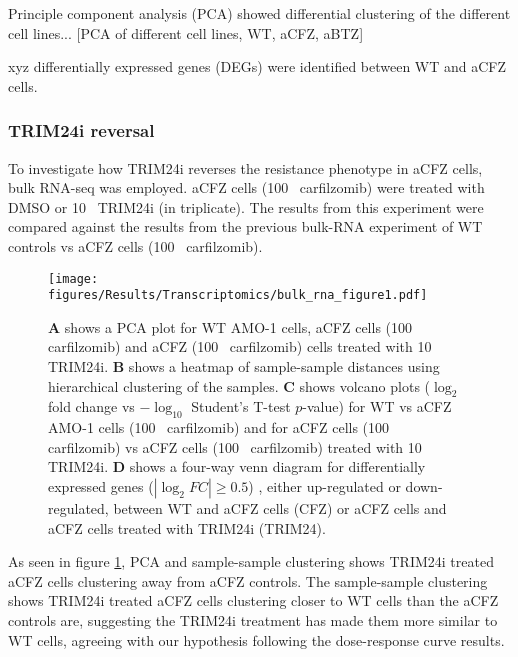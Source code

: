 Principle component analysis (PCA) showed differential clustering of the different cell lines...
[PCA of different cell lines, WT, aCFZ, aBTZ]


xyz differentially expressed genes (DEGs) were identified between WT and aCFZ cells.

\subsubsection{TRIM24i reversal}
To investigate how TRIM24i reverses the resistance phenotype in aCFZ cells, bulk RNA-seq was employed.
aCFZ cells (100\si{\nano\Molar} carfilzomib) were treated with DMSO or 10\si{\mu\Molar} TRIM24i (in triplicate).
The results from this experiment were compared against the results from the previous bulk-RNA experiment of WT controls vs aCFZ cells (100\si{\nano\Molar} carfilzomib).

\begin{figure}[htb]
\centering
\texttt{[image: figures/Results/Transcriptomics/bulk\_rna\_figure1.pdf]}
\caption[WT, aCFZ and TRIM24i reversal, transcriptomics differential expression and clustering]{\textbf{A} shows a PCA plot for WT AMO-1 cells, aCFZ cells (100\si{\nano\Molar} carfilzomib) and aCFZ (100\si{\nano\Molar} carfilzomib) cells treated with 10\si{\mu\Molar} TRIM24i.
\textbf{B} shows a heatmap of sample-sample distances using hierarchical clustering of the samples.
\textbf{C} shows volcano plots ($\log_{2}$ fold change vs $-\log_{10}$ Student's T-test $p$-value) for WT vs aCFZ AMO-1 cells (100\si{\nano\Molar} carfilzomib) and for aCFZ cells (100\si{\nano\Molar} carfilzomib) vs aCFZ cells (100\si{\nano\Molar} carfilzomib) treated with 10\si{\mu\Molar} TRIM24i.
\textbf{D} shows a four-way venn diagram for differentially expressed genes ($|\log_{2}FC| \geq 0.5$) , either up-regulated or down-regulated, between WT and aCFZ cells (CFZ) or aCFZ cells and aCFZ cells treated with TRIM24i (TRIM24).}
\label{fig:bulk_fig1_de_clustering}
\end{figure}

As seen in figure \ref{fig:bulk_fig1_de_clustering}, PCA and sample-sample clustering shows TRIM24i treated aCFZ cells clustering away from aCFZ controls.
The sample-sample clustering shows TRIM24i treated aCFZ cells clustering closer to WT cells than the aCFZ controls are, suggesting the TRIM24i treatment has made them more similar to WT cells, agreeing with our hypothesis following the dose-response curve results.


